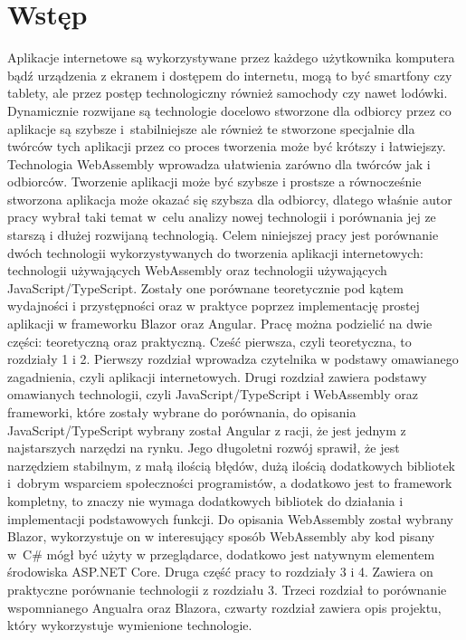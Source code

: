 \documentclass[12pt,a4paper,oneside]{book}
\begin{document}
\chapter*{Wstęp} 
Aplikacje internetowe są wykorzystywane przez każdego użytkownika komputera bądź urządzenia z ekranem i dostępem do internetu, mogą to być smartfony czy tablety, ale przez postęp technologiczny również samochody czy nawet lodówki. Dynamicznie rozwijane są technologie docelowo stworzone dla odbiorcy przez co aplikacje są szybsze i~stabilniejsze ale również te stworzone specjalnie dla twórców tych aplikacji przez co proces tworzenia może być krótszy i łatwiejszy. Technologia WebAssembly wprowadza ułatwienia zarówno dla twórców jak i odbiorców. Tworzenie aplikacji może być szybsze i prostsze a równocześnie stworzona aplikacja może okazać się szybsza dla odbiorcy, dlatego właśnie autor pracy wybrał taki temat w~celu analizy nowej technologii i porównania jej ze starszą i dłużej rozwijaną technologią. Celem niniejszej pracy jest porównanie dwóch technologii wykorzystywanych do tworzenia aplikacji internetowych: technologii używających WebAssembly oraz technologii używających JavaScript/TypeScript. Zostały one porównane teoretycznie pod kątem wydajności i przystępności oraz w praktyce poprzez implementację prostej aplikacji w frameworku Blazor oraz Angular. Pracę można podzielić na dwie części: teoretyczną oraz praktyczną. Cześć pierwsza, czyli teoretyczna, to rozdziały 1 i 2. Pierwszy rozdział wprowadza czytelnika w podstawy omawianego zagadnienia, czyli aplikacji internetowych. Drugi rozdział zawiera podstawy omawianych technologii, czyli JavaScript/TypeScript i WebAssembly oraz frameworki, które zostały wybrane do porównania, do opisania JavaScript/TypeScript wybrany został Angular z racji, że jest jednym z najstarszych narzędzi na rynku. Jego długoletni rozwój sprawił, że jest narzędziem stabilnym, z małą ilością błędów, dużą ilością dodatkowych bibliotek i~dobrym wsparciem społeczności programistów, a dodatkowo jest to framework kompletny, to znaczy nie wymaga dodatkowych bibliotek do działania i implementacji podstawowych funkcji. Do opisania WebAssembly został wybrany Blazor, wykorzystuje on w interesujący sposób WebAssembly aby kod pisany w~C\# mógł być użyty w przeglądarce, dodatkowo jest natywnym elementem środowiska ASP.NET Core. Druga część pracy to rozdziały 3 i 4. Zawiera on praktyczne porównanie technologii z rozdziału 3. Trzeci rozdział to porównanie wspomnianego Angualra oraz Blazora, czwarty rozdział zawiera opis projektu, który wykorzystuje wymienione technologie.
\end{document}
